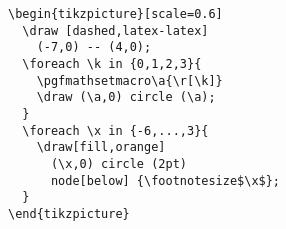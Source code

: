 \documentclass{article}
\begin{document}
\begin{codebox}\small
\begin{verbatim}
\begin{tikzpicture}[scale=0.6]
  \draw [dashed,latex-latex]
    (-7,0) -- (4,0);
  \foreach \k in {0,1,2,3}{
    \pgfmathsetmacro\a{\r[\k]}
    \draw (\a,0) circle (\a);
  }
  \foreach \x in {-6,...,3}{
    \draw[fill,orange]
      (\x,0) circle (2pt)
      node[below] {\footnotesize$\x$};
  }
\end{tikzpicture}
\end{verbatim}
    \tcblower
    \begin{center}
\end{center}
\end{codebox}
\end{document}
